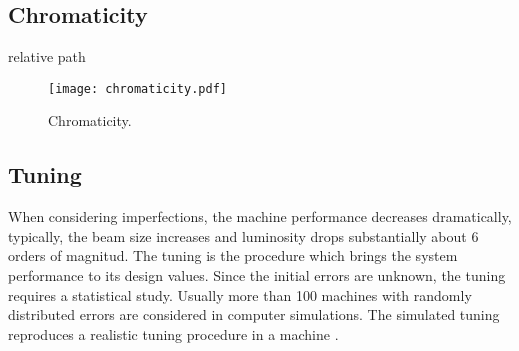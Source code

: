 \subsection{Chromaticity}
relative path 
\begin{figure}[!hbt]
\centering
\texttt{[image: chromaticity.pdf]}\caption{Chromaticity.}\label{f:chrom}
\end{figure}
\subsection{Tuning}
When considering imperfections, the machine performance decreases dramatically, typically, the beam size increases and luminosity drops substantially about 6 orders of magnitud. The tuning is the procedure which brings the system performance to its design values. Since the initial errors are unknown, the tuning requires a statistical study. Usually more than 100 machines with randomly distributed errors are considered in computer simulations. The simulated tuning reproduces a realistic tuning procedure in a machine \cite{GarciaMorales:1982827,Minty:629879}.\par
